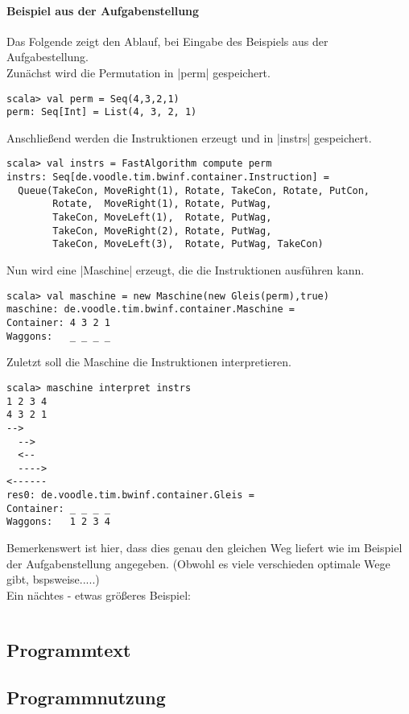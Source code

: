 \paragraph{Beispiel aus der Aufgabenstellung}
Das Folgende zeigt den Ablauf, bei Eingabe des Beispiels aus der Aufgabestellung. \\
Zunächst wird die Permutation in |perm| gespeichert.
\begin{lstlisting}
scala> val perm = Seq(4,3,2,1)               
perm: Seq[Int] = List(4, 3, 2, 1)
\end{lstlisting}
Anschließend werden die Instruktionen erzeugt und in |instrs| gespeichert.
\begin{lstlisting}
scala> val instrs = FastAlgorithm compute perm
instrs: Seq[de.voodle.tim.bwinf.container.Instruction] =
  Queue(TakeCon, MoveRight(1), Rotate, TakeCon, Rotate, PutCon,
        Rotate,  MoveRight(1), Rotate, PutWag,
        TakeCon, MoveLeft(1),  Rotate, PutWag,
        TakeCon, MoveRight(2), Rotate, PutWag,
        TakeCon, MoveLeft(3),  Rotate, PutWag, TakeCon)
\end{lstlisting}
Nun wird eine |Maschine| erzeugt, die die Instruktionen ausführen kann.
\begin{lstlisting}
scala> val maschine = new Maschine(new Gleis(perm),true)
maschine: de.voodle.tim.bwinf.container.Maschine = 
Container: 4 3 2 1
Waggons:   _ _ _ _
\end{lstlisting}
Zuletzt soll die Maschine die Instruktionen interpretieren.
\begin{lstlisting}
scala> maschine interpret instrs                        
1 2 3 4
4 3 2 1
-->
  -->
  <--
  ---->
<------
res0: de.voodle.tim.bwinf.container.Gleis = 
Container: _ _ _ _
Waggons:   1 2 3 4
\end{lstlisting}
Bemerkenswert ist hier, dass dies genau den gleichen Weg liefert wie im Beispiel der Aufgabenstellung angegeben.
(Obwohl es viele verschieden optimale Wege gibt, bspsweise.....)\\
Ein nächtes - etwas größeres Beispiel: %
\begin{lstlisting}

\end{lstlisting}

\subsection{Programmtext}
\subsection{Programmnutzung}
